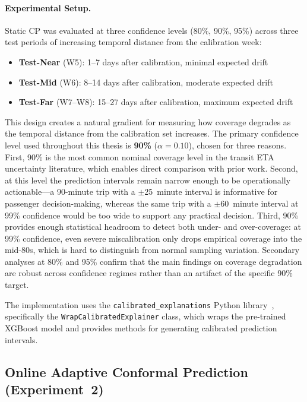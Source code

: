 \paragraph{Experimental Setup.}
Static CP was evaluated at three confidence levels (80\%, 90\%, 95\%) across three test periods of increasing temporal distance from the calibration week:
\begin{itemize}
    \item \textbf{Test-Near} (W5): 1--7 days after calibration, minimal expected drift
    \item \textbf{Test-Mid} (W6): 8--14 days after calibration, moderate expected drift
    \item \textbf{Test-Far} (W7--W8): 15--27 days after calibration, maximum expected drift
\end{itemize}

This design creates a natural gradient for measuring how coverage degrades as the temporal distance from the calibration set increases. The primary confidence level used throughout this thesis is \textbf{90\%} ($\alpha = 0.10$), chosen for three reasons. First, 90\% is the most common nominal coverage level in the transit ETA uncertainty literature, which enables direct comparison with prior work. Second, at this level the prediction intervals remain narrow enough to be operationally actionable---a 90-minute trip with a $\pm$25~minute interval is informative for passenger decision-making, whereas the same trip with a $\pm$60~minute interval at 99\% confidence would be too wide to support any practical decision. Third, 90\% provides enough statistical headroom to detect both under- and over-coverage: at 99\% confidence, even severe miscalibration only drops empirical coverage into the mid-80s, which is hard to distinguish from normal sampling variation. Secondary analyses at 80\% and 95\% confirm that the main findings on coverage degradation are robust across confidence regimes rather than an artifact of the specific 90\% target.

The implementation uses the \texttt{calibrated\_explanations} Python library~\cite{lofstrom2024calibrated}, specifically the \texttt{WrapCalibratedExplainer} class, which wraps the pre-trained XGBoost model and provides methods for generating calibrated prediction intervals.

\subsection{Online Adaptive Conformal Prediction (Experiment~2)}
\label{subsec:online_cp}

